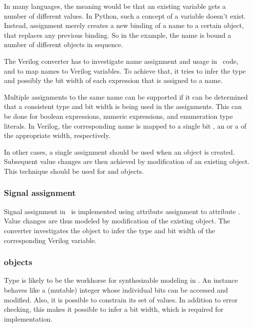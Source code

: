 In many languages, the meaning would be that an
existing variable  gets a number of different values.
In Python, such a concept of a variable doesn't exist. Instead,
assignment merely creates a new binding of a name to a
certain object, that replaces any previous binding.
So in the example, the name  is bound a 
number of different objects in sequence.

The Verilog converter has to investigate name
assignment and usage in \myhdl\ code, and to map
names to Verilog variables. To achieve that,
it tries to infer the type and possibly the
bit width of each expression that is assigned
to a name.

Multiple assignments to the same name can be supported if it can be
determined that a consistent type and bit width is being used in the
assignments. This can be done for boolean expressions, numeric
expressions, and enumeration type literals. In Verilog, the
corresponding name is mapped to a single bit , an
 or a  of the appropriate width, respectively.

In other cases, a single assignment should be used when an object is
created. Subsequent value changes are then achieved by modification of
an existing object.  This technique should be used for 
and  objects.

\subsubsection{Signal assignment\label{conv-meth-assign-signal}}

Signal assignment in \myhdl\ is implemented using attribute assignment
to attribute .  Value changes are thus modeled by
modification of the existing object. The converter investigates the
 object to infer the type and bit width of the
corresponding Verilog variable.

\subsubsection{ objects\label{conv-meth-assign-intbv}}

Type  is likely to be the workhorse for synthesizable
modeling in \myhdl{}. An  instance behaves like a
(mutable) integer whose individual bits can be accessed and
modified. Also, it is possible to constrain its set of values. In
addition to error checking, this makes it possible to infer a bit
width, which is required for implementation.

